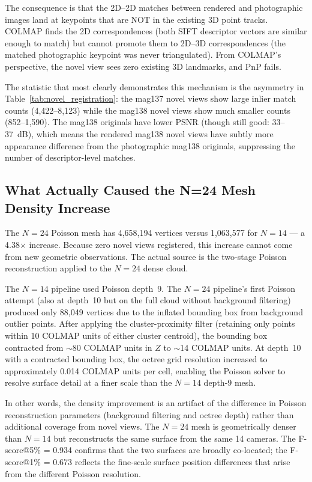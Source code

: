 \documentclass[12pt]{article}
\begin{document}
The consequence is that the 2D--2D matches between rendered and photographic images land at keypoints that are NOT in the existing 3D point tracks. COLMAP finds the 2D correspondences (both SIFT descriptor vectors are similar enough to match) but cannot promote them to 2D--3D correspondences (the matched photographic keypoint was never triangulated). From COLMAP's perspective, the novel view sees zero existing 3D landmarks, and PnP fails.

The statistic that most clearly demonstrates this mechanism is the asymmetry in Table~\ref{tab:novel_registration}: the mag137 novel views show large inlier match counts (4,422--8,123) while the mag138 novel views show much smaller counts (852--1,590). The mag138 originals have lower PSNR (though still good: 33--37~dB), which means the rendered mag138 novel views have subtly more appearance difference from the photographic mag138 originals, suppressing the number of descriptor-level matches.

\subsection{What Actually Caused the N=24 Mesh Density Increase}

The $N{=}24$ Poisson mesh has 4,658,194 vertices versus 1,063,577 for $N{=}14$ --- a 4.38$\times$ increase. Because zero novel views registered, this increase cannot come from new geometric observations. The actual source is the two-stage Poisson reconstruction applied to the $N{=}24$ dense cloud.

The $N{=}14$ pipeline used Poisson depth~9. The $N{=}24$ pipeline's first Poisson attempt (also at depth~10 but on the full cloud without background filtering) produced only 88,049 vertices due to the inflated bounding box from background outlier points. After applying the cluster-proximity filter (retaining only points within 10 COLMAP units of either cluster centroid), the bounding box contracted from $\sim$80 COLMAP units in $Z$ to $\sim$14 COLMAP units. At depth~10 with a contracted bounding box, the octree grid resolution increased to approximately 0.014 COLMAP units per cell, enabling the Poisson solver to resolve surface detail at a finer scale than the $N{=}14$ depth-9 mesh.

In other words, the density improvement is an artifact of the difference in Poisson reconstruction parameters (background filtering and octree depth) rather than additional coverage from novel views. The $N{=}24$ mesh is geometrically denser than $N{=}14$ but reconstructs the same surface from the same 14 cameras. The F-score@5\% = 0.934 confirms that the two surfaces are broadly co-located; the F-score@1\% = 0.673 reflects the fine-scale surface position differences that arise from the different Poisson resolution.
\end{document}
